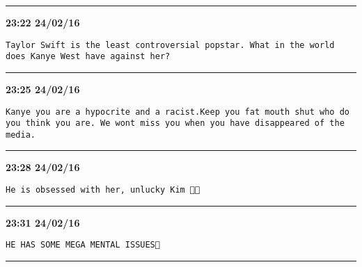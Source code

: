 \hrule%

\begin{adjustwidth}{0cm}{0cm}
\footnotesize \textbf{23:22 24/02/16}

\begin{lstlisting}[breaklines, breakatwhitespace, basicstyle=\small, frame=leftline]
Taylor Swift is the least controversial popstar. What in the world does Kanye West have against her?
\end{lstlisting}
\end{adjustwidth}

\hrule%

\begin{adjustwidth}{0cm}{0cm}
\footnotesize \textbf{23:25 24/02/16}

\begin{lstlisting}[breaklines, breakatwhitespace, basicstyle=\small, frame=leftline]
Kanye you are a hypocrite and a racist.Keep you fat mouth shut who do you think you are. We wont miss you when you have disappeared of the media.
\end{lstlisting}
\end{adjustwidth}

\hrule%

\begin{adjustwidth}{0cm}{0cm}
\footnotesize \textbf{23:28 24/02/16}

\begin{lstlisting}[breaklines, breakatwhitespace, basicstyle=\small, frame=leftline]
He is obsessed with her, unlucky Kim 🖕🏻
\end{lstlisting}
\end{adjustwidth}

\hrule%

\begin{adjustwidth}{0cm}{0cm}
\footnotesize \textbf{23:31 24/02/16}

\begin{lstlisting}[breaklines, breakatwhitespace, basicstyle=\small, frame=leftline]
HE HAS SOME MEGA MENTAL ISSUES🙈
\end{lstlisting}
\end{adjustwidth}

\hrule%

